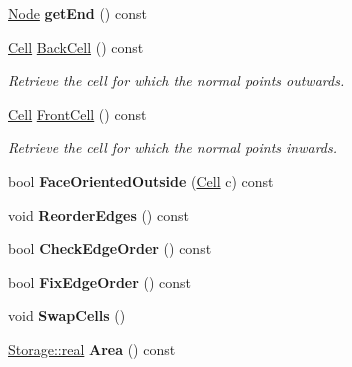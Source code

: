 \begin{DoxyCompactItemize}
\item 
\hypertarget{classINMOST_1_1Face_adb70180c6aad1893e2fe754a8d88e170}{\hyperlink{classINMOST_1_1Node}{Node} {\bfseries get\-End} () const }\label{classINMOST_1_1Face_adb70180c6aad1893e2fe754a8d88e170}

\item 
\hyperlink{classINMOST_1_1Cell}{Cell} \hyperlink{classINMOST_1_1Face_a343f374489d97e5cc41e392f1fd29eea}{Back\-Cell} () const 
\begin{DoxyCompactList}\small\item\em Retrieve the cell for which the normal points outwards. \end{DoxyCompactList}\item 
\hyperlink{classINMOST_1_1Cell}{Cell} \hyperlink{classINMOST_1_1Face_a31695655cabb60aef6e7048d175cd0de}{Front\-Cell} () const 
\begin{DoxyCompactList}\small\item\em Retrieve the cell for which the normal points inwards. \end{DoxyCompactList}\item 
\hypertarget{classINMOST_1_1Face_ac8e9ea9a38d8c5732c3618b21ec6c346}{bool {\bfseries Face\-Oriented\-Outside} (\hyperlink{classINMOST_1_1Cell}{Cell} c) const }\label{classINMOST_1_1Face_ac8e9ea9a38d8c5732c3618b21ec6c346}

\item 
\hypertarget{classINMOST_1_1Face_a0e621e47a29cba52983e2dbe4b5595f5}{void {\bfseries Reorder\-Edges} () const }\label{classINMOST_1_1Face_a0e621e47a29cba52983e2dbe4b5595f5}

\item 
\hypertarget{classINMOST_1_1Face_afe466ba6d89813531fa7d8bcda47c22a}{bool {\bfseries Check\-Edge\-Order} () const }\label{classINMOST_1_1Face_afe466ba6d89813531fa7d8bcda47c22a}

\item 
\hypertarget{classINMOST_1_1Face_a7c197d0d9d1da8b39815ec8193470d55}{bool {\bfseries Fix\-Edge\-Order} () const }\label{classINMOST_1_1Face_a7c197d0d9d1da8b39815ec8193470d55}

\item 
\hypertarget{classINMOST_1_1Face_afc7145b4345851c8b63d4cb1fb3f7fb8}{void {\bfseries Swap\-Cells} ()}\label{classINMOST_1_1Face_afc7145b4345851c8b63d4cb1fb3f7fb8}

\item 
\hypertarget{classINMOST_1_1Face_ae64a118505766e645f81a608d1bca9b3}{\hyperlink{classINMOST_1_1Storage_a853346784b4a5822a7fac54d8f10f805}{Storage\-::real} {\bfseries Area} () const }\label{classINMOST_1_1Face_ae64a118505766e645f81a608d1bca9b3}


\end{DoxyCompactItemize}

